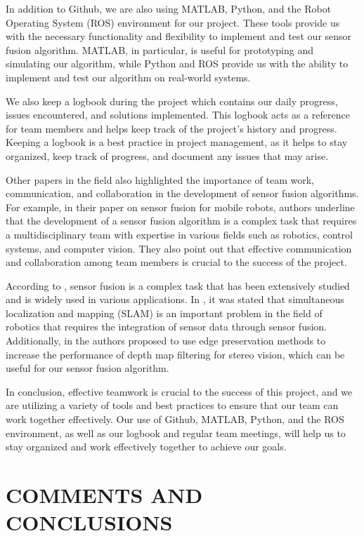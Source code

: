 \documentclass[12pt]{article}
\begin{document}
In addition to Github, we are also using MATLAB, Python, and the Robot Operating System (ROS) environment for our project. These tools provide us with the necessary functionality and flexibility to implement and test our sensor fusion algorithm. MATLAB, in particular, is useful for prototyping and simulating our algorithm, while Python and ROS provide us with the ability to implement and test our algorithm on real-world systems.

We also keep a logbook during the project which contains our daily progress, issues encountered, and solutions implemented. This logbook acts as a reference for team members and helps keep track of the project's history and progress. Keeping a logbook is a best practice in project management, as it helps to stay organized, keep track of progress, and document any issues that may arise.

Other papers in the field also highlighted the importance of team work, communication, and collaboration in the development of sensor fusion algorithms. For example, in their paper on sensor fusion for mobile robots, authors underline that the development of a sensor fusion algorithm is a complex task that requires a multidisciplinary team with expertise in various fields such as robotics, control systems, and computer vision. They also point out that effective communication and collaboration among team members is crucial to the success of the project.

According to \cite{daniilidis2001sensor}, sensor fusion is a complex task that has been extensively studied and is widely used in various applications. In \cite{durrant2006simultaneous}, it was stated that simultaneous localization and mapping (SLAM) is an important problem in the field of robotics that requires the integration of sensor data through sensor fusion. Additionally, in \cite{silva2020edge} the authors proposed to use edge preservation methods to increase the performance of depth map filtering for stereo vision, which can be useful for our sensor fusion algorithm.

In conclusion, effective teamwork is crucial to the success of this project, and we are utilizing a variety of tools and best practices to ensure that our team can work together effectively. Our use of Github, MATLAB, Python, and the ROS environment, as well as our logbook and regular team meetings, will help us to stay organized and work effectively together to achieve our goals.

\section{COMMENTS AND CONCLUSIONS}
\end{document}
